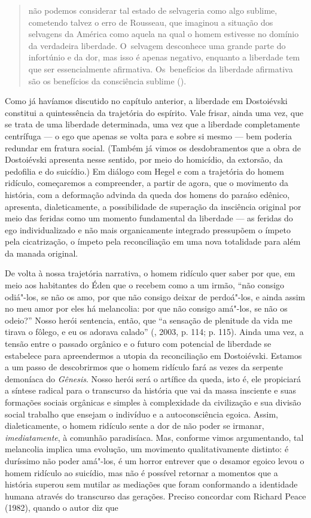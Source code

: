 \begin{quote}
não podemos considerar tal estado de selvageria como algo sublime,
cometendo talvez o erro de Rousseau, que imaginou a situação dos
selvagens da América como aquela na qual o homem estivesse no domínio da
verdadeira liberdade. O~selvagem desconhece uma grande parte do
infortúnio e da dor, mas isso é apenas negativo, enquanto a liberdade
tem que ser essencialmente afirmativa. Os~benefícios da liberdade
afirmativa são os benefícios da consciência sublime ().
\end{quote}

Como já havíamos discutido no capítulo anterior, a liberdade em
Dostoiévski constitui a quintessência da trajetória do espírito. Vale
frisar, ainda uma vez, que se trata de uma liberdade determinada, uma
vez que a liberdade completamente centrífuga --- o ego que apenas se
volta para e sobre si mesmo --- bem poderia redundar em fratura social.
(Também já vimos os desdobramentos que a obra de Dostoiévski apresenta
nesse sentido, por meio do homicídio, da extorsão, da pedofilia e do
suicídio.) Em diálogo com Hegel e com a trajetória do homem ridículo,
começaremos a compreender, a partir de agora, que o movimento da
história, com a deformação advinda da queda dos homens do paraíso
edênico, apresenta, dialeticamente, a possibilidade de superação da
insciência original por meio das feridas como um momento fundamental da
liberdade --- as feridas do ego individualizado e não mais organicamente
integrado pressupõem o ímpeto pela cicatrização, o ímpeto pela
reconciliação em uma nova totalidade para além da manada original.

De volta à nossa trajetória narrativa, o homem ridículo quer saber por
que, em meio aos habitantes do Éden que o recebem como a um irmão, ``não
consigo odiá"-los, se não os amo, por que não consigo deixar de
perdoá"-los, e ainda assim no meu amor por eles há melancolia: por que
não consigo amá"-los, se não os odeio?'' Nosso herói sentencia, então,
que ``a sensação de plenitude da vida me tirava o fôlego, e eu os
adorava calado'' (, 2003, p. 114; p. 115). Ainda uma vez, a
tensão entre o passado orgânico e o futuro com potencial de liberdade se
estabelece para apreendermos a utopia da reconciliação em Dostoiévski.
Estamos a um passo de descobrirmos que o homem ridículo fará as vezes da
serpente demoníaca do \emph{Gênesis}. Nosso herói será o artífice da
queda, isto é, ele propiciará a síntese radical para o transcurso da
história que vai da massa insciente e suas formações sociais orgânicas e
simples à complexidade da civilização e sua divisão social trabalho que
ensejam o indivíduo e a autoconsciência egoica. Assim, dialeticamente, o
homem ridículo sente a dor de não poder se irmanar,
\emph{imediatamente}, à comunhão paradisíaca. Mas, conforme vimos
argumentando, tal melancolia implica uma evolução, um movimento
qualitativamente distinto: é duríssimo não poder amá"-los, é um horror
entrever que o desamor egoico levou o homem ridículo ao suicídio, mas
não é possível retornar a momentos que a história superou sem mutilar as
mediações que foram conformando a identidade humana através do
transcurso das gerações. Preciso concordar com Richard Peace (1982),
quando o autor diz que

